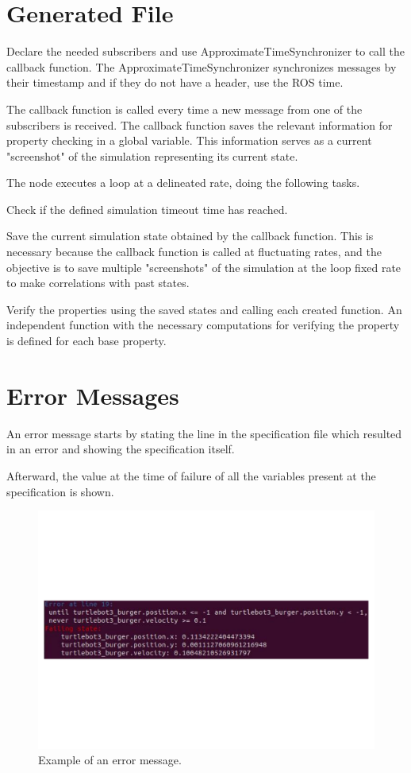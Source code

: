 \section{Generated File}
\label{sec:generatedfile}

Declare the needed subscribers and use ApproximateTimeSynchronizer to call the callback function. The ApproximateTimeSynchronizer synchronizes messages by their timestamp and if they do not have a header, use the ROS time.

The callback function is called every time a new message from one of the subscribers is received. The callback function saves the relevant information for property checking in a global variable. This information serves as a current "screenshot" of the simulation representing its current state.

The node executes a loop at a delineated rate, doing the following tasks. 

Check if the defined simulation timeout time has reached. 

Save the current simulation state obtained by the callback function. This is necessary because the callback function is called at fluctuating rates, and the objective is to save multiple "screenshots" of the simulation at the loop fixed rate to make correlations with past states. 

Verify the properties using the saved states and calling each created function. An independent function with the necessary computations for verifying the property is defined for each base property.


\section{Error Messages}
\label{sec:errormessages}

An error message starts by stating the line in the specification file which resulted in an error and showing the specification itself.

Afterward, the value at the time of failure of all the variables present at the specification is shown.

\begin{figure}[h]
\includegraphics[width=\textwidth]{images/error_message.pdf}
\caption{Example of an error message.} \label{fig:monerror}
\end{figure}